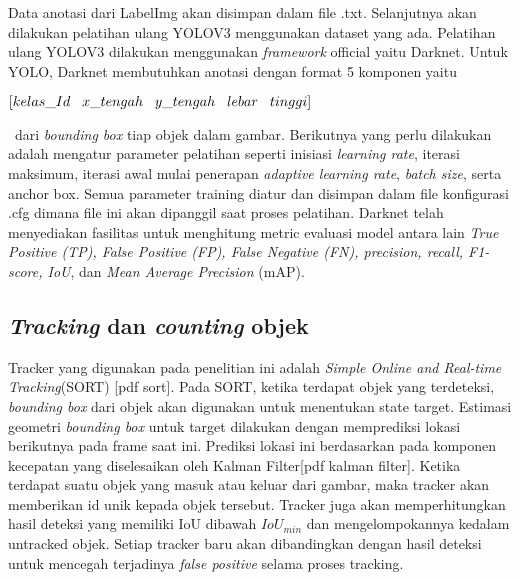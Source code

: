\documentclass[../thesis.tex]{subfiles}
\begin{document}
Data anotasi dari LabelImg akan disimpan dalam file .txt. Selanjutnya akan dilakukan pelatihan ulang YOLOV3 menggunakan dataset yang ada. Pelatihan ulang YOLOV3 dilakukan menggunakan \textit{framework} official yaitu Darknet. Untuk YOLO, Darknet membutuhkan anotasi dengan format
5 komponen yaitu \\ 
\centerline{$[kelas\_Id \hspace{3mm} x\_tengah \hspace{3mm} y\_tengah \hspace{3mm} lebar \hspace{3mm} tinggi]$}\
dari \textit{bounding box} tiap objek dalam gambar. Berikutnya yang perlu dilakukan adalah mengatur parameter pelatihan seperti inisiasi \textit{learning rate}, iterasi maksimum, iterasi awal mulai penerapan \textit{adaptive learning rate}, \textit{batch size}, serta anchor box. Semua parameter training diatur dan disimpan dalam file konfigurasi .cfg dimana file ini akan 
dipanggil saat proses pelatihan. Darknet telah menyediakan fasilitas untuk menghitung metric evaluasi model antara lain \textit{True Positive (TP), False Positive (FP), False Negative (FN), precision, recall, F1-score, IoU}, dan \textit{Mean Average Precision} (mAP).

\subsection{\textit{Tracking} dan \textit{counting} objek}
Tracker yang digunakan pada penelitian ini adalah \textit{Simple Online and Real-time Tracking}(SORT) [pdf sort]. Pada SORT, ketika terdapat objek yang terdeteksi, \textit{bounding box} dari objek akan digunakan untuk menentukan state target. Estimasi geometri \textit{bounding box} untuk target dilakukan dengan memprediksi lokasi berikutnya pada frame saat ini. Prediksi lokasi ini berdasarkan pada komponen kecepatan yang diselesaikan oleh Kalman Filter[pdf kalman filter].
Ketika terdapat suatu objek yang masuk atau keluar dari gambar, maka tracker akan memberikan id unik kepada objek tersebut. Tracker juga akan memperhitungkan hasil deteksi yang memiliki IoU dibawah $IoU_{min}$ dan mengelompokannya kedalam untracked objek. Setiap tracker baru akan dibandingkan dengan hasil deteksi untuk mencegah terjadinya \textit{false positive} selama proses tracking.
\end{document}

